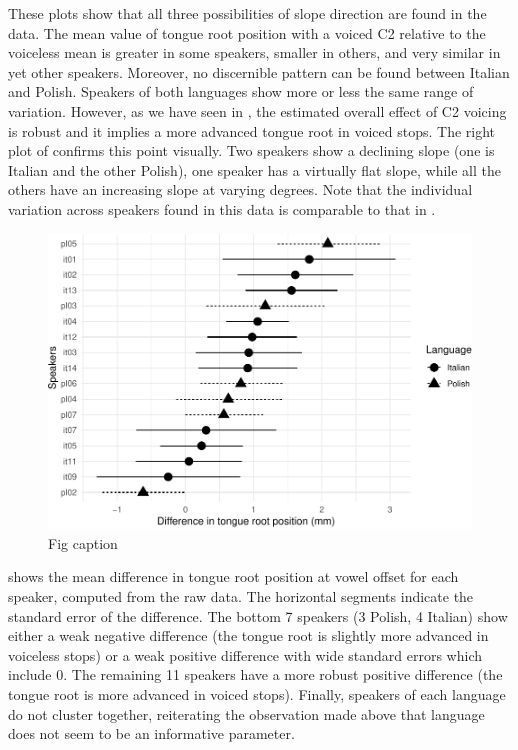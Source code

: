 \documentclass[12pt,]{article}
\begin{document}
These plots show that all three possibilities of slope direction are
found in the data. The mean value of tongue root position with a voiced
C2 relative to the voiceless mean is greater in some speakers, smaller
in others, and very similar in yet other speakers. Moreover, no
discernible pattern can be found between Italian and Polish. Speakers of
both languages show more or less the same range of variation. However,
as we have seen in , the estimated overall effect of C2
voicing is robust and it implies a more advanced tongue root in voiced
stops. The right plot of  confirms this point
visually. Two speakers show a declining slope (one is Italian and the
other Polish), one speaker has a virtually flat slope, while all the
others have an increasing slope at varying degrees. Note that the
individual variation across speakers found in this data is comparable to
that in \citet{ahn2018}.

\begin{figure}
\includegraphics[width=\linewidth]{2018-tra_files/figure-latex/trp-difference-1} \caption{Fig caption}\label{f:trp-difference}
\end{figure}

 shows the mean difference in tongue root
position at vowel offset for each speaker, computed from the raw data.
The horizontal segments indicate the standard error of the difference.
The bottom 7 speakers (3 Polish, 4 Italian) show either a weak negative
difference (the tongue root is slightly more advanced in voiceless
stops) or a weak positive difference with wide standard errors which
include 0. The remaining 11 speakers have a more robust positive
difference (the tongue root is more advanced in voiced stops). Finally,
speakers of each language do not cluster together, reiterating the
observation made above that language does not seem to be an informative
parameter.
\end{document}
